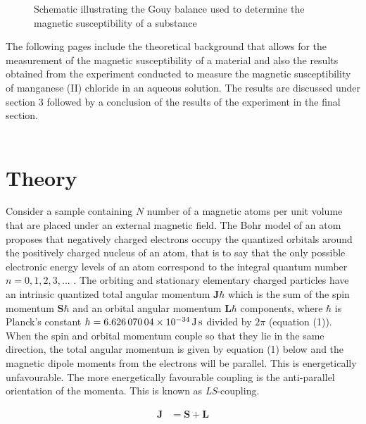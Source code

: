 \documentclass[a4paper,11pt]{article}
\begin{document}
\begin{figure}[ht!]
{}
\caption{Schematic illustrating the Gouy balance used to determine the magnetic susceptibility of a substance}
\label{Fig:1}
\end{figure}

The following pages include the theoretical background that allows for the measurement of the magnetic susceptibility of a material and also the results obtained from the experiment conducted to measure the magnetic susceptibility of manganese (II) chloride in an aqueous solution. The results are discussed under section 3 followed by a conclusion of the results of the experiment in the final section.\\
\\
\section{Theory}

Consider a sample containing $N$ number of a magnetic atoms per unit volume that are placed under an external magnetic field. The Bohr model of an atom proposes that negatively charged electrons occupy the quantized orbitals around the positively charged nucleus of an atom, that is to say that the only possible electronic energy levels of an atom correspond to the integral quantum number $n = 0, 1, 2, 3,...$ \cite{bohr1924}. The orbiting and stationary elementary charged particles have an intrinsic quantized total angular momentum $\mathit{\mathbf{J\hbar}}$ which is the sum of the spin momentum $\mathit{\mathbf{S}}\hbar$ and an orbital angular momentum $\mathit{\mathbf{L}}\hbar$ components, where $\hbar$ is Planck's constant $h = \SI{6.62607004d-34}{\joule\second}$ divided by $2\pi$ (equation (1)). When the spin and orbital momentum couple so that they lie in the same direction, the total angular momentum is given by equation (1) below and the magnetic dipole moments from the electrons will be parallel. This is energetically unfavourable. The more energetically favourable coupling is the anti-parallel  
orientation of the momenta\cite{Masina2018}. This is known as \textit{LS}-coupling. 

\begin{align}
\mathbf{J}	& = \mathbf{S} + \mathbf{L}
\end{align} 
\end{document}

